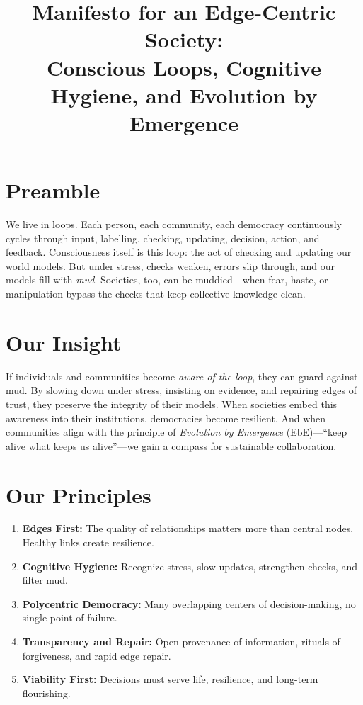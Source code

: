 \documentclass[11pt,a4paper]{article}
\title{\textbf{Manifesto for an Edge-Centric Society:\\
Conscious Loops, Cognitive Hygiene, and Evolution by Emergence}}
\author{}
\date{}
\begin{document}
\maketitle
\onehalfspacing

\section*{Preamble}
We live in loops. Each person, each community, each democracy continuously cycles through input, labelling, checking, updating, decision, action, and feedback. Consciousness itself is this loop: the act of checking and updating our world models. But under stress, checks weaken, errors slip through, and our models fill with \emph{mud}. Societies, too, can be muddied—when fear, haste, or manipulation bypass the checks that keep collective knowledge clean.

\section*{Our Insight}
If individuals and communities become \emph{aware of the loop}, they can guard against mud. By slowing down under stress, insisting on evidence, and repairing edges of trust, they preserve the integrity of their models. When societies embed this awareness into their institutions, democracies become resilient. And when communities align with the principle of \emph{Evolution by Emergence} (EbE)—``keep alive what keeps us alive''—we gain a compass for sustainable collaboration.

\section*{Our Principles}
\begin{enumerate}
  \item \textbf{Edges First:} The quality of relationships matters more than central nodes. Healthy links create resilience.
  \item \textbf{Cognitive Hygiene:} Recognize stress, slow updates, strengthen checks, and filter mud.
  \item \textbf{Polycentric Democracy:} Many overlapping centers of decision-making, no single point of failure.
  \item \textbf{Transparency and Repair:} Open provenance of information, rituals of forgiveness, and rapid edge repair.
  \item \textbf{Viability First:} Decisions must serve life, resilience, and long-term flourishing.
\end{enumerate}
\end{document}
